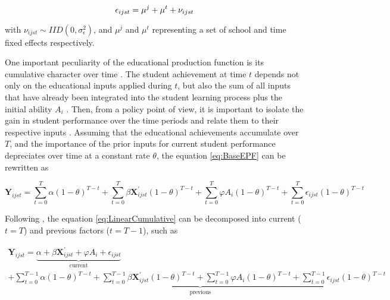 \documentclass[a4paper, 12pt]{article}
\begin{document}
\begin{equation} \label{eq:ErrorTerm}
\epsilon_{ijst} = \mu^j + \mu^t +  \nu_{ijst} \\
\end{equation}



with $\nu_{ijst} \sim IID(0, \sigma^2_{\epsilon})$, and $\mu^{j}$ and $\mu^{t}$ representing a set of school and time fixed effects respectively. 




One important peculiarity of the educational production function is its cumulative character over time \citep[see e.g.][]{britton2016teacher, andrabi2009value, hanushek2002publicly}. The student achievement at time $t$ depends not only on the educational inputs applied during $t$, but also the sum of all inputs that have already been integrated into the student learning process plus the initial ability $A_i$ \citep{rothstein2010teacher, todd2003specification}. Then, from a policy point of view, it is important to isolate the gain in student performance over the time periods and relate them to their respective inputs \citep{hanushek2012distribution, andrabi2009value}. Assuming that the educational achievements accumulate over $T$, and the importance of the prior inputs for current student performance depreciates over time at a constant rate $\theta$, the equation \eqref{eq:BaseEPF} can be rewritten as



\begin{equation} \label{eq:LinearCumulative}
\mathbf{Y}_{ijst} = \sum_{t=0}^T \alpha (1 - \theta)^{T-t} + \sum_{t=0}^T \beta \mathbf{X}_{ijst}^{\prime} (1 - \theta)^{T-t} + \sum_{t=0}^T \varphi A_{i} (1 - \theta)^{T-t} + \sum_{t=0}^T \epsilon_{ijst} (1 - \theta)^{T-t}
\end{equation} 


Following \citet{hanushek2012distribution}, the equation \eqref{eq:LinearCumulative} can be decomposed into current ($t=T$) and previous factors ($t=T-1$), such as


\begin{multline} \label{eq:LinearDecomp}
\mathbf{Y}_{ijst} = \underbrace{\alpha + \beta\mathbf{X}_{ijst}^{\prime} + \varphi A_{i} + \epsilon_{ijst}}_{\text{current}} \\
+ \underbrace{\sum_{t=0}^{T-1} \alpha (1 - \theta)^{T-t} + \sum_{t=0}^{T-1} \beta \mathbf{X}_{ijst}^{\prime} (1 - \theta)^{T-t} + \sum_{t=0}^{T-1} \varphi A_{i} (1 - \theta)^{T-t}  + \sum_{t=0}^{T-1} \epsilon_{ijst} (1 - \theta)^{T-t}}_{\text{previous}}
\end{multline}
\end{document}
